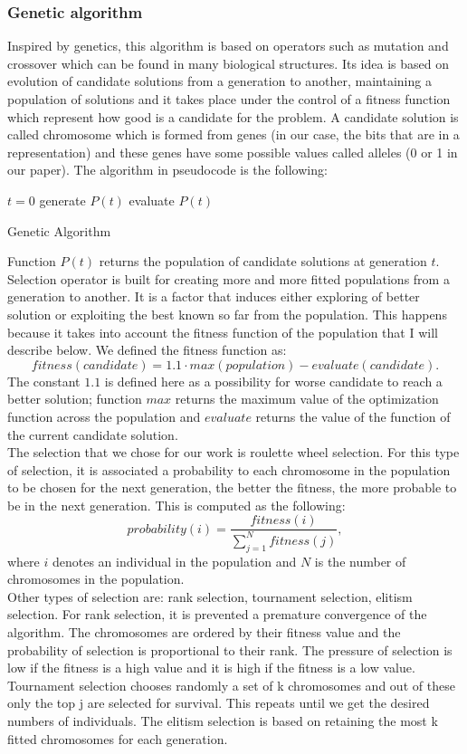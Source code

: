 \documentclass{article}
\begin{document}
\subsubsection{Genetic algorithm}
Inspired by genetics, this algorithm is based on operators such as mutation and crossover which can be found in many biological structures. Its idea is based on evolution of candidate solutions from a generation to another, maintaining a population of solutions and it takes place under the control of a fitness function which represent how good is a candidate for the problem. A candidate solution is called chromosome which is formed from genes (in our case, the bits that are in a representation) and these genes have some possible values called alleles (0 or 1 in our paper).  
The algorithm in pseudocode is the following:
\begin{algorithm}[H]
\SetAlgoLined
 $t = 0$\;
 generate $P(t)$\;
 evaluate $P(t)$\;
\caption{Genetic Algorithm}
\end{algorithm}
Function $P(t)$ returns the population of candidate solutions at generation $t$. Selection operator is built for creating more and more fitted populations from a generation to another. It is a factor that induces either exploring of better solution or exploiting the best known so far from the population. This happens because it takes into account the fitness function of the population that I will describe below. We defined the fitness function as:
$$fitness(candidate) = 1.1 \cdot max(population) - evaluate(candidate).$$
The constant $1.1$ is defined here as a possibility for worse candidate to reach a better solution; function $max$ returns the maximum value of the optimization function across the population and $evaluate$ returns the value of the function of the current candidate solution. \\
The selection that we chose for our work is roulette wheel selection. For this type of selection, it is associated a probability to each chromosome in the population to be chosen for the next generation, the better the fitness, the more probable to be in the next generation. This is computed as the following:
$$probability(i) = \frac{fitness(i)}{\sum_{j = 1}^N fitness(j)},$$
where $i$ denotes an individual in the population and $N$ is the number of chromosomes in the population.\\
Other types of selection are: rank selection, tournament selection, elitism selection. For rank selection, it is prevented a premature convergence of the algorithm. The chromosomes are ordered by their fitness value and the probability of selection is proportional to their rank. The pressure of selection is low if the fitness is a high value and it is high if the fitness is a low value. Tournament selection chooses randomly a set of k chromosomes and out of these only the top j are selected for survival. This repeats until we get the desired numbers of individuals. The elitism selection is based on retaining the most k fitted chromosomes for each generation.\\
\end{document}
